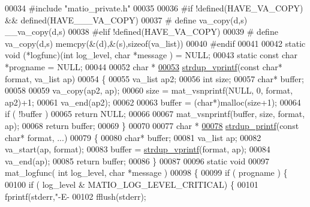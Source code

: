 \begin{DoxyCode}
00034 \textcolor{preprocessor}{#include "matio\_private.h"}
00035 
00036 \textcolor{preprocessor}{#if !defined(HAVE\_VA\_COPY) && defined(HAVE\_\_\_VA\_COPY)}
00037 \textcolor{preprocessor}{#    define va\_copy(d,s) \_\_va\_copy(d,s)}
00038 \textcolor{preprocessor}{#elif !defined(HAVE\_VA\_COPY)}
00039 \textcolor{preprocessor}{#    define va\_copy(d,s) memcpy(&(d),&(s),sizeof(va\_list))}
00040 \textcolor{preprocessor}{#endif}
00041 
00042 \textcolor{keyword}{static} void (*logfunc)(\textcolor{keywordtype}{int} log\_level, \textcolor{keywordtype}{char} *message ) = NULL;
00043 \textcolor{keyword}{static} \textcolor{keyword}{const} \textcolor{keywordtype}{char} *progname = NULL;
00044 
00052 \textcolor{keywordtype}{char} *
\hyperlink{group__mat__util_ga2b342987d3b664345cb233640b611fe9}{00053} \hyperlink{group__mat__util_ga2b342987d3b664345cb233640b611fe9}{strdup\_vprintf}(\textcolor{keyword}{const} \textcolor{keywordtype}{char}* format, va\_list ap)
00054 \{
00055     va\_list ap2;
00056     \textcolor{keywordtype}{int} size;
00057     \textcolor{keywordtype}{char}* buffer;
00058 
00059     va\_copy(ap2, ap);
00060     size = mat\_vsnprintf(NULL, 0, format, ap2)+1;
00061     va\_end(ap2);
00062 
00063     buffer = (\textcolor{keywordtype}{char}*)malloc(size+1);
00064     \textcolor{keywordflow}{if} ( !buffer )
00065         \textcolor{keywordflow}{return} NULL;
00066 
00067     mat\_vsnprintf(buffer, size, format, ap);
00068     \textcolor{keywordflow}{return} buffer;
00069 \}
00070 
00077 \textcolor{keywordtype}{char} *
\hyperlink{group__mat__util_ga291b08f933c75fb70e3736b669896ebd}{00078} \hyperlink{group__mat__util_ga291b08f933c75fb70e3736b669896ebd}{strdup\_printf}(\textcolor{keyword}{const} \textcolor{keywordtype}{char}* format, ...)
00079 \{
00080     \textcolor{keywordtype}{char}* buffer;
00081     va\_list ap;
00082     va\_start(ap, format);
00083     buffer = \hyperlink{group__mat__util_ga2b342987d3b664345cb233640b611fe9}{strdup\_vprintf}(format, ap);
00084     va\_end(ap);
00085     \textcolor{keywordflow}{return} buffer;
00086 \}
00087 
00096 \textcolor{keyword}{static} \textcolor{keywordtype}{void}
00097 mat\_logfunc( \textcolor{keywordtype}{int} log\_level, \textcolor{keywordtype}{char} *message )
00098 \{
00099     \textcolor{keywordflow}{if} ( progname ) \{
00100         \textcolor{keywordflow}{if} ( log\_level & MATIO\_LOG\_LEVEL\_CRITICAL) \{
00101             fprintf(stderr,\textcolor{stringliteral}{"-E- %
00102             fflush(stderr);
}
\end{DoxyCode}
